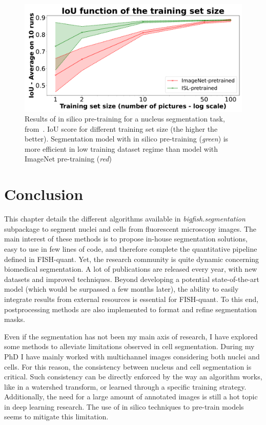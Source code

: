 \begin{figure}[]
    \centering
    \includegraphics[width=\textwidth]{figures/chapter3/insilico_training_size}
    \caption[Results of in silico pre-training]{Results of in silico pre-training for a nucleus segmentation task, from~\cite{Bonte_2022}.
	IoU score for different training set size (the higher the better).
	Segmentation model with in silico pre-training (\textit{green}) is more efficient in low training dataset regime than model with ImageNet pre-training (\textit{red})}
    \label{fig:results_insilico}
\end{figure}

\section{Conclusion}
\label{sec:segmentation_conclusion}

This chapter details the different algorithms available in \emph{bigfish.segmentation} subpackage to segment nuclei and cells from fluorescent microscopy images.
The main interest of these methods is to propose in-house segmentation solutions, easy to use in few lines of code, and therefore complete the quantitative pipeline defined in FISH-quant.
Yet, the research community is quite dynamic concerning biomedical segmentation.
A lot of publications are released every year, with new datasets and improved techniques.
Beyond developing a potential state-of-the-art model (which would be surpassed a few months later), the ability to easily integrate results from external resources is essential for FISH-quant.
To this end, postprocessing methods are also implemented to format and refine segmentation masks.

Even if the segmentation has not been my main axis of research, I have explored some methods to alleviate limitations observed in cell segmentation.
During my PhD I have mainly worked with multichannel images considering both nuclei and cells.
For this reason, the consistency between nucleus and cell segmentation is critical.
Such consistency can be directly enforced by the way an algorithm works, like in a watershed transform, or learned through a specific training strategy.
Additionally, the need for a large amount of annotated images is still a hot topic in deep learning research.
The use of in silico techniques to pre-train models seems to mitigate this limitation.